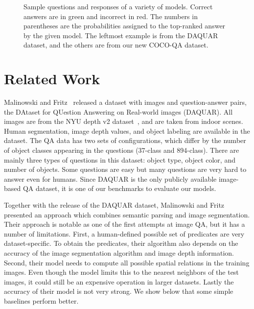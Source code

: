 \documentclass{article} \usepackage{nips15submit_e,times}
\renewcommand{\#}[1]{\textbf{#1}}
\begin{document}
\begin{figure}
\caption{Sample questions and responses of a variety of models. 
Correct answers are in green and incorrect in red. The numbers in parentheses 
are the probabilities assigned to the top-ranked answer by the given model. 
The leftmost example is from the DAQUAR dataset, and the others are from our 
new COCO-QA dataset.}
\label{fig:demo_questions}
\end{figure}

\section{Related Work}
Malinowski and Fritz~\cite{malinowski14a} released a dataset with images and
question-answer pairs, the DAtaset for QUestion Answering on Real-world images
(DAQUAR). All images are from the NYU depth v2 dataset~\cite{silberman12}, and
are taken from indoor scenes. Human segmentation, image depth values, and
object labeling are available in the dataset. The QA data has two sets of
configurations, which differ by the number of object classes appearing in the
questions (37-class and 894-class). There are mainly three types of questions
in this dataset: object type, object color, and number of objects. Some
questions are easy but many questions are very hard to answer even for humans.
Since DAQUAR is the only publicly available image-based QA dataset, it is one
of our benchmarks to evaluate our models.

Together with the release of the DAQUAR dataset, Malinowski and Fritz presented
an approach which combines semantic parsing and image segmentation. Their
approach is notable as one of the first attempts at image QA, but it has a
number of limitations. First, a human-defined possible set of predicates are
very dataset-specific. To obtain the predicates, their algorithm also depends
on the accuracy of the image segmentation algorithm and image depth
information.  Second, their model needs to compute all possible spatial
relations in the training images. Even though the model limits this to the
nearest neighbors of the test images, it could still be an expensive operation
in larger datasets.  Lastly the accuracy of their model is not very strong. We
show below that some simple baselines perform better.
\end{document}
